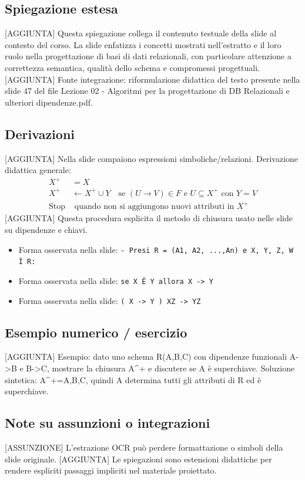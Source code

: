 \documentclass[11pt]{article}
\begin{document}
\subsection*{Spiegazione estesa}
[AGGIUNTA] Questa spiegazione collega il contenuto testuale della slide al contesto del corso. La slide enfatizza i concetti mostrati nell'estratto e il loro ruolo nella progettazione di basi di dati relazionali, con particolare attenzione a correttezza semantica, qualità dello schema e compromessi progettuali.
[AGGIUNTA] Fonte integrazione: riformulazione didattica del testo presente nella slide 47 del file Lezione 02 - Algoritmi per la progettazione di DB Relazionali e ulteriori dipendenze.pdf.
\subsection*{Derivazioni}
[AGGIUNTA] Nella slide compaiono espressioni simboliche/relazioni. Derivazione didattica generale:
\begin{align*}
X^+ &= X \\
X^+ &\leftarrow X^+ \cup Y \quad \text{se } (U \to V) \in F \text{ e } U \subseteq X^+ \text{ con } Y=V \\
\text{Stop} &\text{ quando non si aggiungono nuovi attributi in } X^+
\end{align*}
[AGGIUNTA] Questa procedura esplicita il metodo di chiusura usato nelle slide su dipendenze e chiavi.
\begin{itemize}[leftmargin=*]
\item Forma osservata nella slide: \texttt{-  Presi R = (A1, A2, ...,An) e X, Y, Z, W Í R:}
\item Forma osservata nella slide: \texttt{se X   Ê Y allora X -> Y}
\item Forma osservata nella slide: \texttt{( X -> Y )   XZ -> YZ}
\end{itemize}
\subsection*{Esempio numerico / esercizio}
[AGGIUNTA] Esempio: dato uno schema R(A,B,C) con dipendenze funzionali A->B e B->C, mostrare la chiusura A^+ e discutere se A è superchiave. Soluzione sintetica: A^+={A,B,C}, quindi A determina tutti gli attributi di R ed è superchiave.
\subsection*{Note su assunzioni o integrazioni}
[ASSUNZIONE] L'estrazione OCR può perdere formattazione o simboli della slide originale.
[AGGIUNTA] Le spiegazioni sono estensioni didattiche per rendere espliciti passaggi impliciti nel materiale proiettato.
\end{document}
